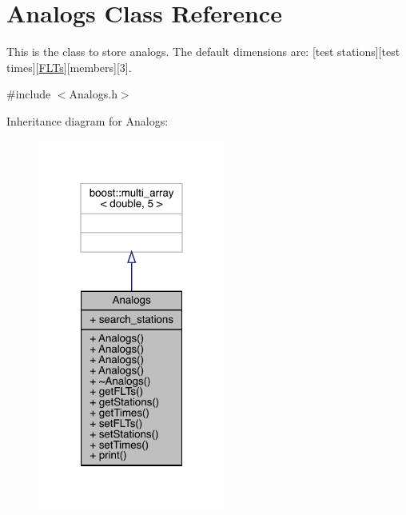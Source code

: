 \hypertarget{class_analogs}{}\section{Analogs Class Reference}
\label{class_analogs}


This is the class to store analogs. The default dimensions are\+: \mbox{[}test stations\mbox{]}\mbox{[}test times\mbox{]}\mbox{[}\mbox{\hyperlink{class_f_l_ts}{F\+L\+Ts}}\mbox{]}\mbox{[}members\mbox{]}\mbox{[}3\mbox{]}.  




{\ttfamily \#include $<$Analogs.\+h$>$}



Inheritance diagram for Analogs\+:
\nopagebreak
\begin{figure}[H]
\begin{center}
\leavevmode
\includegraphics[width=175pt]{class_analogs__inherit__graph}
\end{center}
\end{figure}


